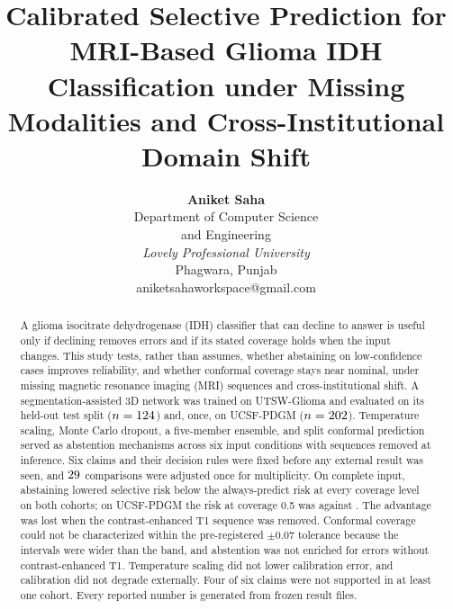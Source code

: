 \documentclass[journal]{IEEEtran}
\begin{document}
\title{Calibrated Selective Prediction for MRI-Based Glioma IDH Classification under Missing Modalities and Cross-Institutional Domain Shift}

\author{
\begin{tabular}{c}
\textbf{Aniket Saha}\\
Department of Computer Science \\
and Engineering\\
\textit{Lovely Professional University}\\
Phagwara, Punjab\\
aniketsahaworkspace@gmail.com
\end{tabular}
}

\maketitle

\begin{abstract}
A glioma isocitrate dehydrogenase (IDH) classifier that can decline to answer is useful only if declining removes errors and if its stated coverage holds when the input changes. This study tests, rather than assumes, whether abstaining on low-confidence cases improves reliability, and whether conformal coverage stays near nominal, under missing magnetic resonance imaging (MRI) sequences and cross-institutional shift. A segmentation-assisted 3D network was trained on UTSW-Glioma and evaluated on its held-out test split ($n=124$) and, once, on UCSF-PDGM ($n=202$). Temperature scaling, Monte Carlo dropout, a five-member ensemble, and split conformal prediction served as abstention mechanisms across six input conditions with sequences removed at inference. Six claims and their decision rules were fixed before any external result was seen, and $29$ comparisons were adjusted once for multiplicity. On complete input, abstaining lowered selective risk below the always-predict risk at every coverage level on both cohorts; on UCSF-PDGM the risk at coverage 0.5 was \numExtRiskZeroFive{} against \numExtAlwaysFull{}. The advantage was lost when the contrast-enhanced T1 sequence was removed. Conformal coverage could not be characterized within the pre-registered $\pm0.07$ tolerance because the intervals were wider than the band, and abstention was not enriched for errors without contrast-enhanced T1. Temperature scaling did not lower calibration error, and calibration did not degrade externally. Four of six claims were not supported in at least one cohort. Every reported number is generated from frozen result files.
\end{abstract}
\end{document}
